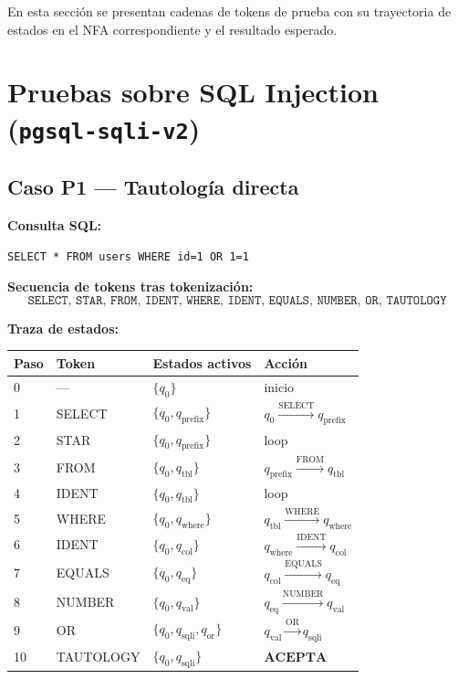 \documentclass[12pt, a4paper]{report}
\theoremstyle{definition}
\theoremstyle{remark}
\begin{document}
En esta sección se presentan cadenas de tokens de prueba con su trayectoria
de estados en el NFA correspondiente y el resultado esperado.

\section{Pruebas sobre SQL Injection (\texttt{pgsql-sqli-v2})}

\subsection{Caso P1 — Tautología directa}

\textbf{Consulta SQL:}
\begin{lstlisting}[style=json, numbers=none]
SELECT * FROM users WHERE id=1 OR 1=1
\end{lstlisting}

\textbf{Secuencia de tokens tras tokenización:}
\[
  \texttt{SELECT, STAR, FROM, IDENT, WHERE, IDENT, EQUALS, NUMBER, OR, TAUTOLOGY}
\]

\textbf{Traza de estados:}
\begin{center}
\begin{tabular}{llll}
  \toprule
  \textbf{Paso} & \textbf{Token} & \textbf{Estados activos} & \textbf{Acción} \\
  \midrule
  0  & —            & $\{q_0\}$                              & inicio \\
  1  & SELECT       & $\{q_0, q_{\text{prefix}}\}$           & $q_0 \xrightarrow{\text{SELECT}} q_{\text{prefix}}$ \\
  2  & STAR         & $\{q_0, q_{\text{prefix}}\}$           & loop \\
  3  & FROM         & $\{q_0, q_{\text{tbl}}\}$              & $q_{\text{prefix}} \xrightarrow{\text{FROM}} q_{\text{tbl}}$ \\
  4  & IDENT        & $\{q_0, q_{\text{tbl}}\}$              & loop \\
  5  & WHERE        & $\{q_0, q_{\text{where}}\}$            & $q_{\text{tbl}} \xrightarrow{\text{WHERE}} q_{\text{where}}$ \\
  6  & IDENT        & $\{q_0, q_{\text{col}}\}$              & $q_{\text{where}} \xrightarrow{\text{IDENT}} q_{\text{col}}$ \\
  7  & EQUALS       & $\{q_0, q_{\text{eq}}\}$               & $q_{\text{col}} \xrightarrow{\text{EQUALS}} q_{\text{eq}}$ \\
  8  & NUMBER       & $\{q_0, q_{\text{val}}\}$              & $q_{\text{eq}} \xrightarrow{\text{NUMBER}} q_{\text{val}}$ \\
  9  & OR           & $\{q_0, q_{\text{sqli}}, q_{\text{or}}\}$ & $q_{\text{val}} \xrightarrow{\text{OR}} q_{\text{sqli}}$ \\
  10 & TAUTOLOGY    & $\{q_0, q_{\text{sqli}}\}$             & $\mathbf{ACEPTA}$ \\
  \bottomrule
\end{tabular}
\end{center}
\end{document}
